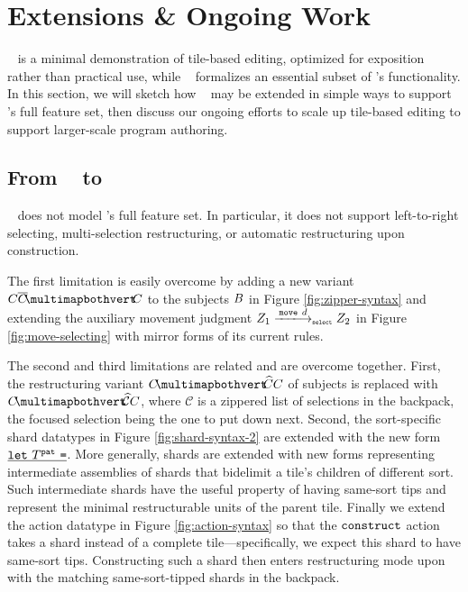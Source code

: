 \section{Extensions \& Ongoing Work}

\tylr~ is a minimal demonstration of tile-based
editing, optimized for exposition rather than practical use,
while \ty~ formalizes an essential subset of \tylr's functionality.
In this section, we will sketch how \ty~ may be extended
in simple ways to support \tylr's full feature set,
then discuss our ongoing efforts to scale up tile-based
editing to support larger-scale program authoring.

\subsection{From \ty~ to \tylr}

\ty~ does not model \tylr's full feature set.
In particular, it does not support left-to-right selecting,
multi-selection restructuring, or automatic restructuring
upon construction.

The first limitation is easily overcome by adding
a new variant $\selectingRight{\selection}{\selection}{\selection}$
to the subjects $B$ in Figure \ref{fig:zipper-syntax}
and extending the auxiliary movement judgment
$\smove{\editState_1}{\direction}{\editState_2}$
in Figure \ref{fig:move-selecting}
with mirror forms of its current rules.

The second and third limitations are related
and are overcome together.
First, the restructuring variant $\restructuring{\selection}{\selection}{\selection}$
of subjects is replaced with $\restructuring{\selection}{\mathcal{C}}\selection$,
where $\mathcal{C}$ is a zippered list of selections in the backpack,
the focused selection being the one to put down next.
Second, the sort-specific shard datatypes in Figure \ref{fig:shard-syntax-2}
are extended with
the new form $\underline{\texttt{let}~T^{\texttt{pat}}~\texttt{=}}$.
More generally, shards are extended with new forms
representing intermediate assemblies of shards that
bidelimit a tile's children of different sort.
Such intermediate shards have the useful property of having same-sort
tips and represent the minimal restructurable units of the
parent tile.
Finally we extend the action datatype in Figure \ref{fig:action-syntax}
so that the $\texttt{construct}$ action takes a shard instead of
a complete tile---specifically, we expect this shard to have same-sort tips.
Constructing such a shard then enters restructuring mode
upon with the matching same-sort-tipped shards in the backpack.


